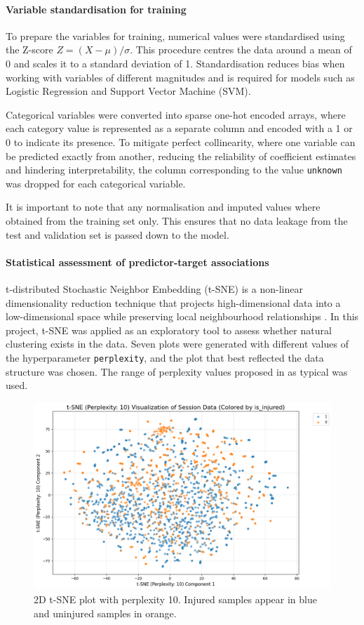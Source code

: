\paragraph{Variable standardisation for training}\label{para:met-var-standarisation}
To prepare the variables for training, numerical values were standardised using the Z-score $Z = (X - \mu) / \sigma$. This procedure centres the data around a mean of 0 and scales it to a standard deviation of 1. Standardisation reduces bias when working with variables of different magnitudes and is required for models such as Logistic Regression and Support Vector Machine (SVM).

Categorical variables were converted into sparse one-hot encoded arrays, where each category value is represented as a separate column and encoded with a 1 or 0 to indicate its presence. To mitigate perfect collinearity, where one variable can be predicted exactly from another, reducing the reliability of coefficient estimates and hindering interpretability, the column corresponding to the value \texttt{unknown} was dropped for each categorical variable.

It is important to note that any normalisation and imputed values where obtained from the training set only. This ensures that no data leakage from the test and validation set is passed down to the model.

\paragraph{Statistical assessment of predictor-target associations}
t-distributed Stochastic Neighbor Embedding (t-SNE) is a non-linear dimensionality reduction technique that projects high-dimensional data into a low-dimensional space while preserving local neighbourhood relationships \citep{JMLR:v9:vandermaaten08a}. In this project, t-SNE was applied as an exploratory tool to assess whether natural clustering exists in the data. Seven plots were generated with different values of the hyperparameter \texttt{perplexity}, and the plot that best reflected the data structure was chosen. The range of perplexity values proposed in \citet{JMLR:v9:vandermaaten08a} as typical was used.

\begin{figure}[ht]
    \centering
    \includegraphics[width=0.5\columnwidth]{images/t-sne-p10-scatter-is_injured.png}
    \caption[2D t-SNE plot with perplexity 10]{2D t-SNE plot with perplexity 10. Injured samples appear in blue and uninjured samples in orange.\label{fig:met-tsne-injured}}
\end{figure}

